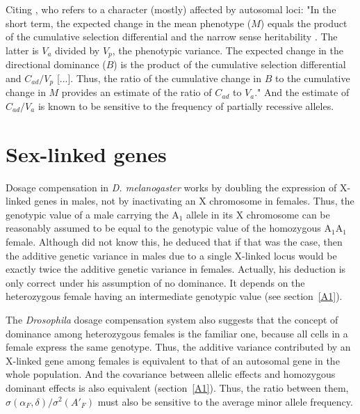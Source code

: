 \documentclass[a4paper,12pt]{article}
\begin{document}
Citing \citet{Kelly1999}, who refers to a character (mostly) affected by autosomal loci: "In the short term, the expected change in the mean phenotype ($M$) equals the product of the cumulative selection differential and the narrow sense heritability \citep{Falconer1989}. The latter is $V_a$ divided by $V_p$, the phenotypic variance. The expected change in the directional dominance ($B$) is the product of the cumulative selection differential and $C_{ad} / V_p$ [...]. Thus, the ratio of the cumulative change in $B$ to the cumulative change in $M$ provides an estimate of the ratio of $C_{ad}$ to $V_a$." And the estimate of $C_{ad}/V_a$ is known to be sensitive to the frequency of partially recessive alleles.

\section{Sex-linked genes}
Dosage compensation in \emph{D. melanogaster} works by doubling the expression of X-linked genes in males, not by inactivating an X chromosome in females. Thus, the genotypic value of a male carrying the A$_1$ allele in its X chromosome can be reasonably assumed to be equal to the genotypic value of the homozygous A$_1$A$_1$ female. Although \citet{James1973} did not know this, he deduced that if that was the case, then the additive genetic variance in males due to a single X-linked locus would be exactly twice the additive genetic variance in females. Actually, his deduction is only correct under his assumption of no dominance. It depends on the heterozygous female having an intermediate genotypic value (see section~\ref{A1}).

The \emph{Drosophila} dosage compensation system also suggests that the concept of dominance among heterozygous females is the familiar one, because all cells in a female express the same genotype. Thus, the additive variance contributed by an X-linked gene among females is equivalent to that of an autosomal gene in the whole population. And the covariance between allelic effects and homozygous dominant effects is also equivalent (section~\ref{A1}). Thus, the ratio between them, $\sigma(\alpha_F, \delta)/\sigma^2(A'_F)$ must also be sensitive to the average minor allele frequency.
\end{document}
